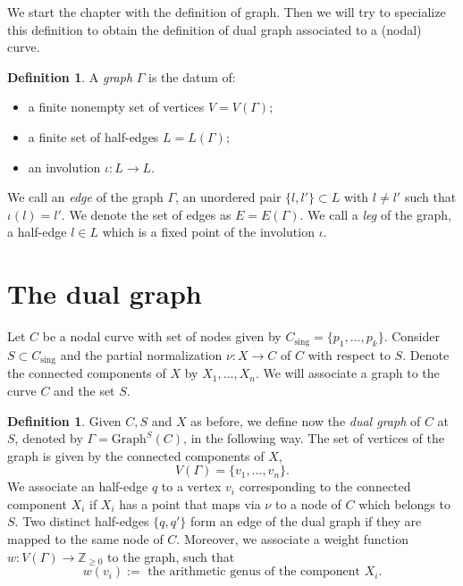 \documentclass[a4paper,12 pt,titlepage,twoside]{book}
\newcommand{\numberset}{\mathbb}
\newcommand{\Z}{\numberset{Z}}
\theoremstyle{plain}
\theoremstyle{theorem}
\theoremstyle{definition}
\newtheorem{defn}[thm]{Definition}
\theoremstyle{remark}
\begin{document}
	We start the chapter with the definition of graph. Then we will try to specialize this definition to obtain the definition of dual graph associated to a (nodal) curve.
	\begin{defn}\label{graph def}
		A \emph{graph} $\Gamma$ is the datum of: \begin{itemize}
			\item a finite nonempty set of vertices $V=V(\Gamma);$
			\item a finite set of half-edges $L=L(\Gamma);$
			\item an involution $\iota \colon L \rightarrow L$.
		\end{itemize}
		We call an \emph{edge} of the graph $\Gamma$, an unordered pair $\{l,l'\} \subset L$ with $l \neq l'$ such that $\iota (l) = l'.$ We denote the set of edges as $E = E(\Gamma).$ We call a \emph{leg} of the graph, a half-edge $l \in L$ which is a fixed point of the involution $\iota$.
	\end{defn}
	
	\section{The dual graph}
	Let $C$ be a nodal curve with set of nodes given by $C_{\text{sing}} = \{p_1, \dots, p_k\}.$ Consider $S \subset C_{\text{sing}}$ and the partial normalization $\nu \colon X \rightarrow C$ of $C$ with respect to $S$.
	Denote the connected components of $X$ by $X_1, \dots, X_n$. We will associate a graph to the curve $C$ and the set $S$.
	\begin{defn}\label{dual graph def}
		Given $C, S$ and $X$ as before, we define now the \emph{dual graph} of $C$ at $S$, denoted by $ \Gamma =\text{Graph}^S(C)$, in the following way. The set of vertices of the graph is given by the connected components of $X$, $$V(\Gamma)= \{v_1, \dots, v_n\}.$$ We associate an half-edge $q$ to a vertex $v_i$ corresponding to the connected component $X_i$ if $X_i$ has a point that maps via $\nu$ to a node of $C$ which belongs to $S$. Two distinct half-edges $\{q,q'\}$ form an edge of the dual graph if they are  mapped to the same node of $C$. Moreover, we associate a weight function $w \colon V(\Gamma) \rightarrow \Z_{\ge 0}$ to the graph, such that $$w(v_i) := \text{ the arithmetic genus of the component } X_i.$$
	\end{defn}
	
	
\end{document}
